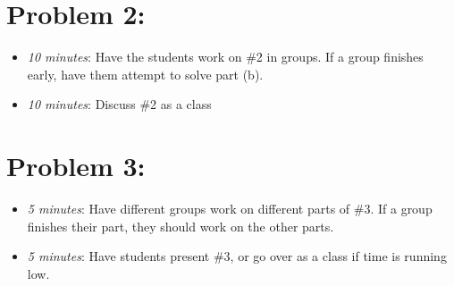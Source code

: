 \documentclass[handout,nooutcomes]{ximera}
\begin{document}
\section*{Problem 2:}

	\begin{itemize}
	
	\item  \emph{10 minutes}:  Have the students work on \#2 in groups.  If a group finishes early, have them attempt to solve part (b).
		
	\item  \emph{10 minutes}:  Discuss \#2 as a class
			
	\end{itemize}
	
	
	
\section*{Problem 3:}

	\begin{itemize}
	
	\item  \emph{5 minutes}:  Have different groups work on different parts of \#3. If a group finishes their part, they should work on the other parts.
	
	\item  \emph{5 minutes}:  Have students present \#3, or go over as a class if time is running low.
	
	\end{itemize}
	



	
	
	

	
	

	
	
	

	
	
	
\end{document}
